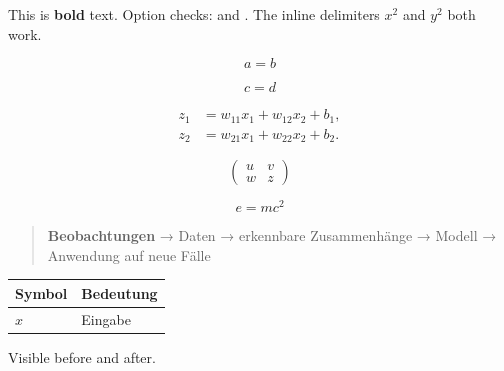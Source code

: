 \begin{frame}[t]

This is \textbf{bold} text.
Option checks: \cite{single} and \parencite{group}.
The inline delimiters $x^2$ and \(y^2\) both work.

\[
a = b
\]

\[
c = d
\]

\[
\begin{aligned}
z_1 &= w_{11}x_1+w_{12}x_2+b_1, \\
z_2 &= w_{21}x_1+w_{22}x_2+b_2.
\end{aligned}
\]

\[\begin{pmatrix}
u & v \\
w & z
\end{pmatrix}\]


\begin{equation}
e = mc^2
\end{equation}

\begin{quote}
\textbf{Beobachtungen} → Daten → erkennbare Zusammenhänge → Modell → Anwendung auf neue Fälle
\end{quote}

\par\addvspace{\medskipamount}
\noindent\begin{tabularx}{\linewidth}{@{}>{\raggedright\arraybackslash}X>{\raggedright\arraybackslash}X@{}}
\toprule
Symbol & Bedeutung \\
\midrule
$x$ & Eingabe \\
\bottomrule
\end{tabularx}
\par\addvspace{\medskipamount}

%
%
%
Visible before %
and after.

\end{frame}

